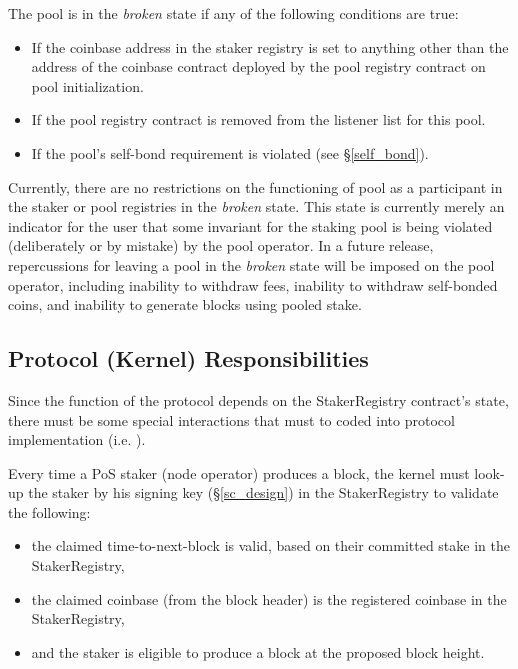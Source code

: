 The pool is in the \textit{broken} state if any of the following conditions are true: 
\begin{itemize}
    \item If the coinbase address in the staker registry is set to anything other than the address of the coinbase contract deployed by the pool registry contract on pool initialization. 
    \item If the pool registry contract is removed from the listener list for this pool. 
    \item If the pool's self-bond requirement is violated (see \S\ref{self_bond}).
\end{itemize}

Currently, there are no restrictions on the functioning of pool as a participant in the staker or pool registries in the \textit{broken} state. This state is currently merely an indicator for the user that some invariant for the staking pool is being violated (deliberately or by mistake) by the pool operator. In a future release, repercussions for leaving a pool in the \textit{broken} state will be imposed on the pool operator, including inability to withdraw fees, inability to withdraw self-bonded coins, and inability to generate blocks using pooled stake.

\subsection{Protocol (Kernel) Responsibilities}
Since the function of the protocol depends on the StakerRegistry contract's state, there must be some special interactions that must to coded into protocol implementation (i.e. ). 

Every time a PoS staker (node operator) produces a block, the kernel must look-up the staker by his signing key (\S\ref{sc_design}) in the StakerRegistry to validate the following:
\begin{itemize}[label=--,nosep]
    \item the claimed time-to-next-block is valid, based on their committed stake in the StakerRegistry,
    \item the claimed coinbase (from the block header) is the registered coinbase in the StakerRegistry,
    \item and the staker is eligible to produce a block at the proposed block height. 
\end{itemize}
